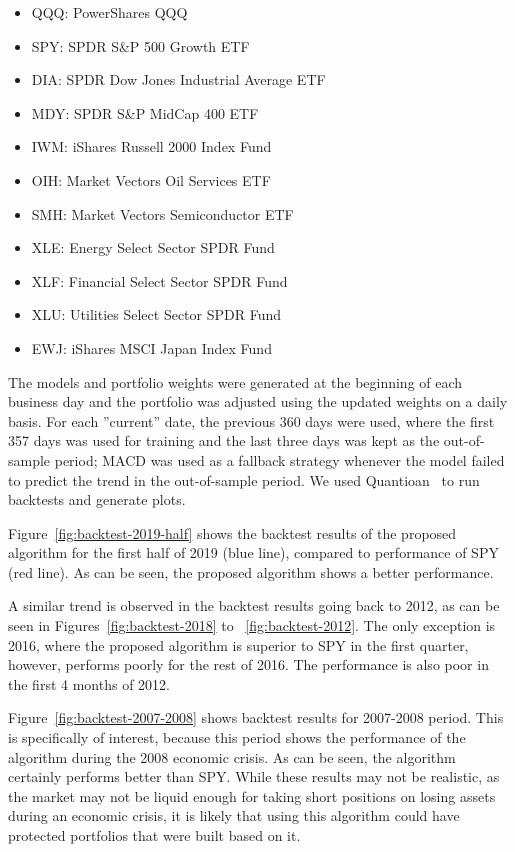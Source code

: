 \documentclass{article}
\begin{document}
\begin{itemize}
    \item[] QQQ: PowerShares QQQ 
    \item[] SPY: SPDR S\&P 500 Growth ETF 
    \item[] DIA: SPDR Dow Jones Industrial Average ETF 
    \item[] MDY: SPDR S\&P MidCap 400 ETF 
    \item[] IWM: iShares Russell 2000 Index Fund 
    \item[] OIH: Market Vectors Oil Services ETF 
    \item[] SMH: Market Vectors Semiconductor ETF 
    \item[] XLE: Energy Select Sector SPDR Fund 
    \item[] XLF: Financial Select Sector SPDR Fund 
    \item[] XLU: Utilities Select Sector SPDR Fund 
    \item[] EWJ: iShares MSCI Japan Index Fund
\end{itemize}

The models and portfolio weights were generated at the beginning of
each business day and the portfolio was adjusted using the updated
weights on a daily basis. For each ''current'' date, the previous 360
days were used, where the first 357 days was used for training and the
last three days was kept as the out-of-sample period; MACD was used as
a fallback strategy whenever the model failed to predict the trend in
the out-of-sample period. We used Quantioan~\cite{ref:quantopian} to
run backtests and generate plots.

Figure~\ref{fig:backtest-2019-half} shows the backtest results of the
proposed algorithm for the first half of 2019 (blue line), compared to
performance of SPY (red line). As can be seen, the proposed algorithm
shows a better performance.

A similar trend is observed in the backtest results going back to
2012, as can be seen in Figures~\ref{fig:backtest-2018} to
~\ref{fig:backtest-2012}. The only exception is 2016, where the
proposed algorithm is superior to SPY in the first quarter, however,
performs poorly for the rest of 2016. The performance is also poor in
the first 4 months of 2012.

Figure~\ref{fig:backtest-2007-2008} shows backtest results for
2007-2008 period. This is specifically of interest, because this
period shows the performance of the algorithm during the 2008 economic
crisis. As can be seen, the algorithm certainly performs better than
SPY. While these results may not be realistic, as the market may not
be liquid enough for taking short positions on losing assets during an
economic crisis, it is likely that using this algorithm could have
protected portfolios that were built based on it.
\end{document}
